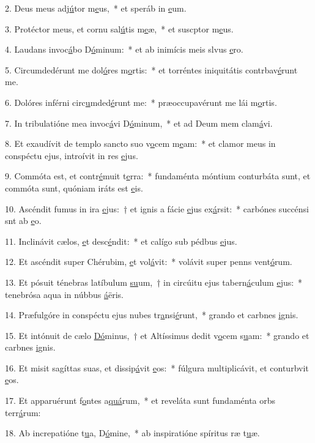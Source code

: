 2. Deus meus adj\uline{ú}tor m\uline{e}us,~* et speráb in \uline{e}um.\par 
3. Protéctor meus, et cornu sal\uline{ú}tis m\uline{e}æ,~* et suscptor m\uline{e}us.\par 
4. Laudans invoc\uline{á}bo D\uline{ó}minum:~* et ab inimícis meis slvus \uline{e}ro.\par 
5. Circumdedérunt me dol\uline{ó}res m\uline{o}rtis:~* et torréntes iniquitátis contrbav\uline{é}runt me.\par 
6. Dolóres inférni circ\uline{u}mded\uline{é}runt me:~* præoccupavérunt me lái m\uline{o}rtis.\par 
7. In tribulatióne mea invoc\uline{á}vi D\uline{ó}minum,~* et ad Deum mem clam\uline{á}vi.\par 
8. Et exaudívit de templo sancto suo v\uline{o}cem m\uline{e}am:~* et clamor meus in conspéctu ejus, introívit in res \uline{e}jus.\par 
9. Commóta est, et contr\uline{é}muit t\uline{e}rra:~* fundaménta móntium conturbáta sunt, et commóta sunt, quóniam iráts est \uline{e}is.\par 
10. Ascéndit fumus in ira \uline{e}jus:~† et ignis a fácie \uline{e}jus ex\uline{á}rsit:~* carbónes succénsi snt ab \uline{e}o.\par 
11. Inclinávit cælos, \uline{e}t desc\uline{é}ndit:~* et calígo sub pédbus \uline{e}jus.\par 
12. Et ascéndit super Chérubim, \uline{e}t vol\uline{á}vit:~* volávit super penns vent\uline{ó}rum.\par 
13. Et pósuit ténebras latíbulum \uline{su}um,~† in circúitu ejus tabern\uline{á}culum \uline{e}jus:~* tenebrósa aqua in núbbus \uline{á}ëris.\par 
14. Præfulgóre in conspéctu ejus nubes tr\uline{a}nsi\uline{é}runt,~* grando et carbnes \uline{i}gnis.\par 
15. Et intónuit de cælo \uline{Dó}minus,~† et Altíssimus dedit v\uline{o}cem s\uline{u}am:~* grando et carbnes \uline{i}gnis.\par 
16. Et misit sagíttas suas, et dissip\uline{á}vit \uline{e}os:~* fúlgura multiplicávit, et conturbvit \uline{e}os.\par 
17. Et apparuérunt f\uline{o}ntes a\uline{quá}rum,~* et reveláta sunt fundaménta orbs terr\uline{á}rum:\par 
18. Ab increpatióne t\uline{u}a, D\uline{ó}mine,~* ab inspiratióne spíritus ræ t\uline{u}æ.\par 
